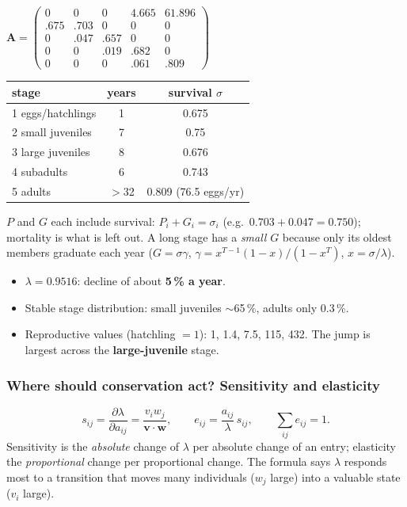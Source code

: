 \begin{center}
\small
$\mathbf A=\begin{pmatrix}0&0&0&4.665&61.896\\.675&.703&0&0&0\\0&.047&.657&0&0\\0&0&.019&.682&0\\0&0&0&.061&.809\end{pmatrix}$
\qquad
\begin{tabular}{lcc}
\toprule
stage & years & survival $\sigma$\\\midrule
1 eggs/hatchlings & 1 & 0.675\\
2 small juveniles & 7 & 0.75\\
3 large juveniles & 8 & 0.676\\
4 subadults & 6 & 0.743\\
5 adults & $>$32 & 0.809 (76.5 eggs/yr)\\\bottomrule
\end{tabular}
\end{center}

$P$ and $G$ each include survival: $P_i+G_i=\sigma_i$ (e.g.\ $0.703+0.047=0.750$); mortality is what is left out.
A long stage has a \emph{small} $G$ because only its oldest members graduate each year
($G=\sigma\gamma$, $\gamma=x^{T-1}(1-x)/(1-x^T)$, $x=\sigma/\lambda$).

\begin{itemize}
\item $\lambda=0.9516$: decline of about \textbf{5\,\% a year}.
\item Stable stage distribution: small juveniles $\sim$65\,\%, adults only 0.3\,\%.
\item Reproductive values (hatchling $=1$): 1, 1.4, 7.5, 115, 432. The jump is largest across the
\textbf{large-juvenile} stage.
\end{itemize}

\subsubsection*{Where should conservation act? Sensitivity and elasticity}
\[
s_{ij}=\frac{\partial\lambda}{\partial a_{ij}}=\frac{v_iw_j}{\mathbf v\cdot\mathbf w},\qquad
e_{ij}=\frac{a_{ij}}{\lambda}\,s_{ij},\qquad \sum_{ij}e_{ij}=1.
\]
Sensitivity is the \emph{absolute} change of $\lambda$ per absolute change of an entry; elasticity the
\emph{proportional} change per proportional change. The formula says $\lambda$ responds most to a transition that
moves many individuals ($w_j$ large) into a valuable state ($v_i$ large).

